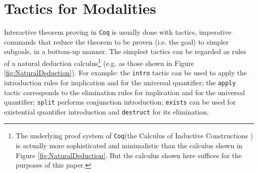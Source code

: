 \documentclass{llncs}
\newcommand{\Coq}{\texttt{Coq}\xspace}
\begin{document}
\section{Tactics for Modalities}
\label{sec:Tactics}

Interactive theorem proving in \Coq is usually done with tactics,
imperative commands that reduce the theorem to be proven (i.e. the
goal) to simpler subgoals, in a bottom-up manner. The simplest tactics
can be regarded as rules of a natural deduction calculus\footnote{The
underlying proof system of \Coq (the Calculus of Inductive
Constructions \cite{Paulin}) is actually more sophisticated and
minimalistic than the calculus shown in Figure
\ref{fig:NaturalDeduction}. But the calculus shown here suffices for
the purposes of this paper.} (e.g. as those shown in Figure
\ref{fig:NaturalDeduction}).  For example: the \texttt{intro} tactic
can be used to apply the introduction rules for implication and for
the universal quantifier; the \texttt{apply} tactic corresponds to the
elimination rules for implication and for the universal quantifier;
\texttt{split} performs conjunction introduction; \texttt{exists} can
be used for existential quantifier introduction and \texttt{destruct}
for its elimination.


\newcommand{\s}{\qquad}
\end{document}
